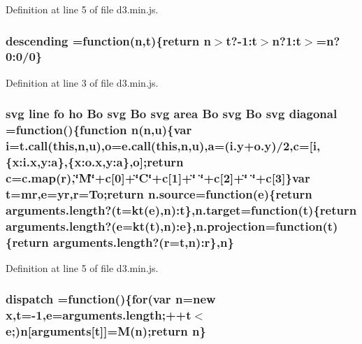 Definition at line 5 of file d3.\+min.\+js.

\subsubsection[{descending}]{ descending =function({\bf n},t)\{{\bf return} {\bf n}$>$t?-\/1\+:t$>${\bf n}?1\+:t$>$={\bf n}?0\+:0/0\}}\label{d3_8min_8js_aabe75c12f2a2e272da3ac3d83a45ebda}


Definition at line 3 of file d3.\+min.\+js.

\subsubsection[{diagonal}]{ {\bf svg} {\bf line} {\bf fo} {\bf ho} {\bf Bo} {\bf svg} {\bf Bo} {\bf svg} {\bf area} {\bf Bo} {\bf svg} {\bf Bo} {\bf svg} diagonal =function()\{function {\bf n}({\bf n},u)\{var {\bf i}={\bf t.\+call}({\bf this},{\bf n},u),{\bf o}={\bf e.\+call}({\bf this},{\bf n},u),{\bf a}=(i.\+y+o.\+y)/2,{\bf c}=[{\bf i},\{{\bf x\+:i.\+x},y\+:a\},\{{\bf x\+:o.\+x},y\+:a\},{\bf o}];{\bf return} {\bf c}={\bf c.\+map}({\bf r}),\char`\"{}M\char`\"{}+c[0]+\char`\"{}C\char`\"{}+c[1]+\char`\"{} \char`\"{}+{\bf c}[2]+\char`\"{} \char`\"{}+{\bf c}[3]\}var t={\bf mr},{\bf e}={\bf yr},{\bf r}={\bf To};{\bf return} n.\+source=function({\bf e})\{{\bf return} arguments.\+length?(t=kt({\bf e}),{\bf n})\+:t\},n.\+target=function(t)\{{\bf return} arguments.\+length?({\bf e}=kt(t),{\bf n})\+:{\bf e}\},{\bf n.\+projection}=function(t)\{{\bf return} arguments.\+length?({\bf r}=t,{\bf n})\+:{\bf r}\},{\bf n}\}}\label{d3_8min_8js_aee6abd6dbcba3af0086e04b06710fb6e}


Definition at line 5 of file d3.\+min.\+js.

\subsubsection[{dispatch}]{ dispatch =function()\{{\bf for}(var {\bf n}=new {\bf x},t=-\/1,{\bf e}=arguments.\+length;++t$<${\bf e};){\bf n}[arguments[t]]=M({\bf n});{\bf return} {\bf n}\}}\label{d3_8min_8js_a78a38f0402e73c6432c6980ca86eef1c}


